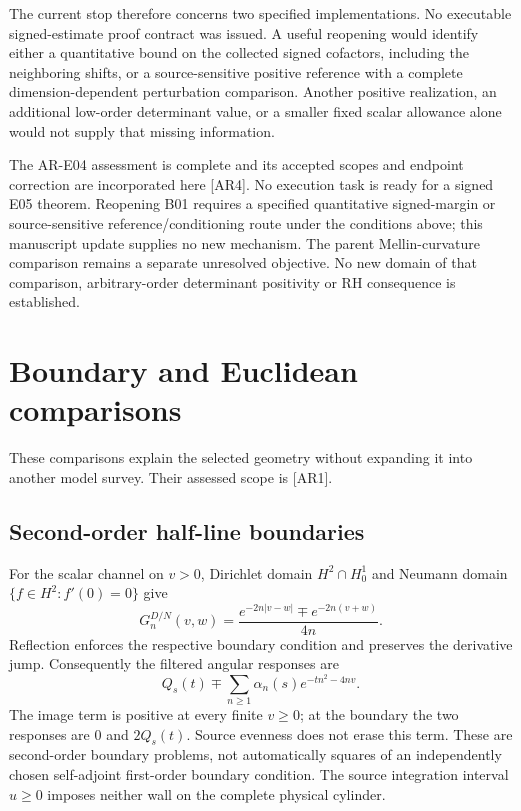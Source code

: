 \documentclass[11pt,letterpaper]{article}
\numberwithin{equation}{section}
\theoremstyle{remark}
\newcommand{\evid}[1]{\textsf{[#1]}}
\begin{document}
The current stop therefore concerns two specified implementations.
No executable signed-estimate proof contract was issued.
A useful reopening would identify either a quantitative bound on
the collected signed cofactors, including the neighboring shifts,
or a source-sensitive positive reference with a complete
dimension-dependent perturbation comparison. Another positive
realization, an additional low-order determinant value, or a
smaller fixed scalar allowance alone would not supply that missing
information.

The AR-E04 assessment is complete and its accepted scopes and endpoint
correction are incorporated here \evid{AR4}. No execution task is ready
for a signed E05 theorem. Reopening B01 requires a specified quantitative
signed-margin or source-sensitive reference/conditioning route under the
conditions above; this manuscript update supplies no new mechanism.
The parent Mellin-curvature comparison remains a separate unresolved
objective. No new domain of that comparison, arbitrary-order determinant
positivity or RH consequence is established.

\appendix
\section{Boundary and Euclidean comparisons}
\label{sec:alternatives}

These comparisons explain the selected geometry without expanding
it into another model survey. Their assessed scope is \evid{AR1}.

\subsection{Second-order half-line boundaries}

For the scalar channel on \(v>0\), Dirichlet domain
\(H^2\cap H_0^1\) and Neumann domain
\(\{f\in H^2:f'(0)=0\}\) give
\begin{equation}
 G_n^{D/N}(v,w)=
 \frac{e^{-2n|v-w|}\mp e^{-2n(v+w)}}{4n}.
 \label{eq:wall}
\end{equation}
Reflection enforces the respective boundary condition and
preserves the derivative jump. Consequently the filtered angular
responses are
\begin{equation}
 Q_s(t)\mp\sum_{n\ge1}\alpha_n(s)e^{-tn^2-4nv}.
 \label{eq:wall-response}
\end{equation}
The image term is positive at every finite \(v\ge0\); at the
boundary the two responses are \(0\) and \(2Q_s(t)\).
Source evenness does not erase this term.
These are second-order boundary problems, not automatically squares
of an independently chosen self-adjoint first-order boundary
condition. The source integration interval \(u\ge0\) imposes
neither wall on the complete physical cylinder.
\end{document}
